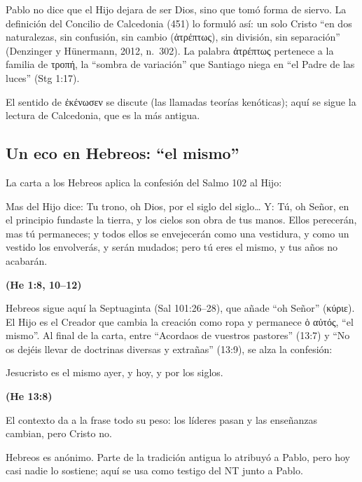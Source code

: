\documentclass[11pt,letterpaper]{article}
\newcommand{\grc}[1]{\foreignlanguage{ancientgreek}{#1}}
\newcommand{\fuente}[1]{\par\hfill{\upshape\bfseries\small\textcolor{azul}{#1}}}
\begin{document}
Pablo no dice que el Hijo dejara de ser Dios, sino que tomó forma de siervo. La definición del Concilio de Calcedonia (451) lo formuló así: un solo Cristo ``en dos naturalezas, sin confusión, sin cambio (\grc{ἀτρέπτως}), sin división, sin separación'' (Denzinger y Hünermann, 2012, n.~302). La palabra \grc{ἀτρέπτως} pertenece a la familia de \grc{τροπή}, la ``sombra de variación'' que Santiago niega en ``el Padre de las luces'' (Stg 1:17).

\begin{nota}[Precisión]
El sentido de \grc{ἐκένωσεν} se discute (las llamadas teorías kenóticas); aquí se sigue la lectura de Calcedonia, que es la más antigua.
\end{nota}

\subsection{Un eco en Hebreos: ``el mismo''}
La carta a los Hebreos aplica la confesión del Salmo 102 al Hijo:

\begin{cita}Mas del Hijo dice: Tu trono, oh Dios, por el siglo del siglo\ldots{} Y: Tú, oh Señor, en el principio fundaste la tierra, y los cielos son obra de tus manos. Ellos perecerán, mas tú permaneces; y todos ellos se envejecerán como una vestidura, y como un vestido los envolverás, y serán mudados; pero tú eres el mismo, y tus años no acabarán.\fuente{(He 1:8, 10--12)}\end{cita}

Hebreos sigue aquí la Septuaginta (Sal 101:26--28), que añade ``oh Señor'' (\grc{κύριε}). El Hijo es el Creador que cambia la creación como ropa y permanece \grc{ὁ αὐτός}, ``el mismo''. Al final de la carta, entre ``Acordaos de vuestros pastores'' (13:7) y ``No os dejéis llevar de doctrinas diversas y extrañas'' (13:9), se alza la confesión:

\begin{cita}Jesucristo es el mismo ayer, y hoy, y por los siglos.\fuente{(He 13:8)}\end{cita}

El contexto da a la frase todo su peso: los líderes pasan y las enseñanzas cambian, pero Cristo no.

\begin{nota}[Precisión]
Hebreos es anónimo. Parte de la tradición antigua lo atribuyó a Pablo, pero hoy casi nadie lo sostiene; aquí se usa como testigo del NT junto a Pablo.
\end{nota}
\end{document}
